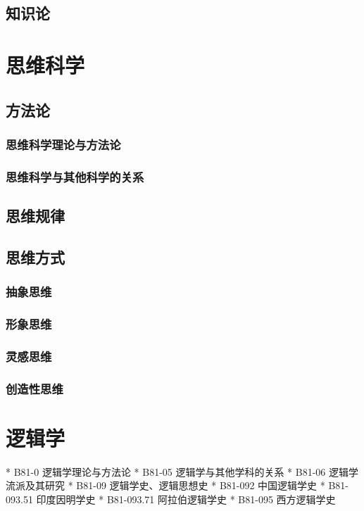 \documentclass[UTF8]{../RepresentationUniverse}
\begin{document}
    \section{知识论}


    
\chapter{思维科学}
\section{方法论}
    \subsection{思维科学理论与方法论}
    \subsection{思维科学与其他科学的关系}
\section{思维规律}
\section{思维方式}
    \subsection{抽象思维}
    \subsection{形象思维}
    \subsection{灵感思维}
    \subsection{创造性思维}



\chapter{逻辑学}
* B81-0 逻辑学理论与方法论
* B81-05 逻辑学与其他学科的关系
* B81-06 逻辑学流派及其研究
* B81-09 逻辑学史、逻辑思想史
  * B81-092 中国逻辑学史
      * B81-093.51 印度因明学史
      * B81-093.71 阿拉伯逻辑学史
  * B81-095 西方逻辑学史
\end{document}
